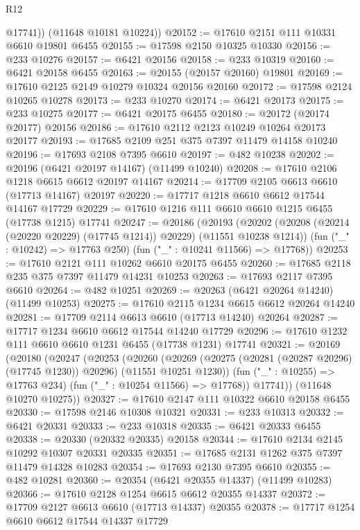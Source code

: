 \begin{lexlean}{R12}
\begin{coremodule}
          @17741))
      (@11648 @10181 @10224))
@20152 := @17610 @2151 @111 @10331 @6610 @19801 @6455
@20155 := @17598 @2150 @10325 @10330
@20156 := @233 @10276
@20157 := @6421 @20156
@20158 := @233 @10319
@20160 := @6421 @20158 @6455
@20163 := @20155 (@20157 @20160) @19801
@20169 := @17610 @2125 @2149 @10279 @10324 @20156 @20160
@20172 := @17598 @2124 @10265 @10278
@20173 := @233 @10270
@20174 := @6421 @20173
@20175 := @233 @10275
@20177 := @6421 @20175 @6455
@20180 := @20172 (@20174 @20177) @20156
@20186 := @17610 @2112 @2123 @10249 @10264 @20173 @20177
@20193 := @17685 @2109 @251 @375 @7397 @11479 @14158 @10240
@20196 := @17693 @2108 @7395 @6610
@20197 := @482 @10238
@20202 := @20196 (@6421 @20197 @14167) (@11499 @10240)
@20208 := @17610 @2106 @1218 @6615 @6612 @20197 @14167
@20214 := @17709 @2105 @6613 @6610 (@17713 @14167) @20197
@20220 := @17717 @1218 @6610 @6612 @17544 @14167 @17729
@20229 := @17610 @1216 @111 @6610 @6610 @1215 @6455 (@17738 @1215) @17741
@20247 := @20186
    (@20193
      (@20202 (@20208 (@20214 (@20220 @20229) (@17745 @1214)) @20229) (@11551 @10238 @1214))
      (fun ("_" : @10242) => @17763 @250)
      (fun ("_" : @10241 @11566) => @17768))
@20253 := @17610 @2121 @111 @10262 @6610 @20175 @6455
@20260 := @17685 @2118 @235 @375 @7397 @11479 @14231 @10253
@20263 := @17693 @2117 @7395 @6610
@20264 := @482 @10251
@20269 := @20263 (@6421 @20264 @14240) (@11499 @10253)
@20275 := @17610 @2115 @1234 @6615 @6612 @20264 @14240
@20281 := @17709 @2114 @6613 @6610 (@17713 @14240) @20264
@20287 := @17717 @1234 @6610 @6612 @17544 @14240 @17729
@20296 := @17610 @1232 @111 @6610 @6610 @1231 @6455 (@17738 @1231) @17741
@20321 := @20169
    (@20180
      (@20247
        (@20253
          (@20260
            (@20269 (@20275 (@20281 (@20287 @20296) (@17745 @1230)) @20296) (@11551 @10251 @1230))
            (fun ("_" : @10255) => @17763 @234)
            (fun ("_" : @10254 @11566) => @17768))
          @17741))
      (@11648 @10270 @10275))
@20327 := @17610 @2147 @111 @10322 @6610 @20158 @6455
@20330 := @17598 @2146 @10308 @10321
@20331 := @233 @10313
@20332 := @6421 @20331
@20333 := @233 @10318
@20335 := @6421 @20333 @6455
@20338 := @20330 (@20332 @20335) @20158
@20344 := @17610 @2134 @2145 @10292 @10307 @20331 @20335
@20351 := @17685 @2131 @1262 @375 @7397 @11479 @14328 @10283
@20354 := @17693 @2130 @7395 @6610
@20355 := @482 @10281
@20360 := @20354 (@6421 @20355 @14337) (@11499 @10283)
@20366 := @17610 @2128 @1254 @6615 @6612 @20355 @14337
@20372 := @17709 @2127 @6613 @6610 (@17713 @14337) @20355
@20378 := @17717 @1254 @6610 @6612 @17544 @14337 @17729

\end{coremodule}
\end{lexlean}
